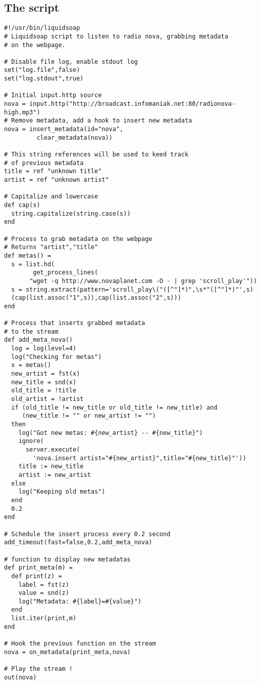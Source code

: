 \subsection{The script}
\begin{verbatim}
#!/usr/bin/liquidsoap
# Liquidsoap script to listen to radio nova, grabbing metadata
# on the webpage.

# Disable file log, enable stdout log
set("log.file",false)
set("log.stdout",true)

# Initial input.http source
nova = input.http("http://broadcast.infomaniak.net:80/radionova-high.mp3")
# Remove metadata, add a hook to insert new metadata
nova = insert_metadata(id="nova",
         clear_metadata(nova))

# This string references will be used to keed track
# of previous metadata
title = ref "unknown title"
artist = ref "unknown artist"

# Capitalize and lowercase
def cap(s)
  string.capitalize(string.case(s))
end

# Process to grab metadata on the webpage
# Returns "artist","title"
def metas() = 
  s = list.hd(
        get_process_lines(
	   "wget -q http://www.novaplanet.com -O - | grep 'scroll_play'"))
  s = string.extract(pattern='scroll_play\("([^"]*)",\s*"([^"]*)"',s)
  (cap(list.assoc("1",s)),cap(list.assoc("2",s)))
end

# Process that inserts grabbed metadata
# to the stream
def add_meta_nova()
  log = log(level=4)
  log("Checking for metas")
  x = metas()
  new_artist = fst(x)
  new_title = snd(x)
  old_title = !title
  old_artist = !artist
  if (old_title != new_title or old_title != new_title) and 
     (new_title != "" or new_artist != "") 
  then
    log("Got new metas: #{new_artist} -- #{new_title}")
    ignore(
      server.execute(
        'nova.insert artist="#{new_artist}",title="#{new_title}"'))
    title := new_title
    artist := new_artist
  else
    log("Keeping old metas")
  end
  0.2
end

# Schedule the insert process every 0.2 second
add_timeout(fast=false,0.2,add_meta_nova)

# function to display new metadatas
def print_meta(m) = 
  def print(z) = 
    label = fst(z)
    value = snd(z)
    log("Metadata: #{label}=#{value}")
  end
  list.iter(print,m)
end

# Hook the previous function on the stream
nova = on_metadata(print_meta,nova)

# Play the stream !
out(nova)
\end{verbatim}
